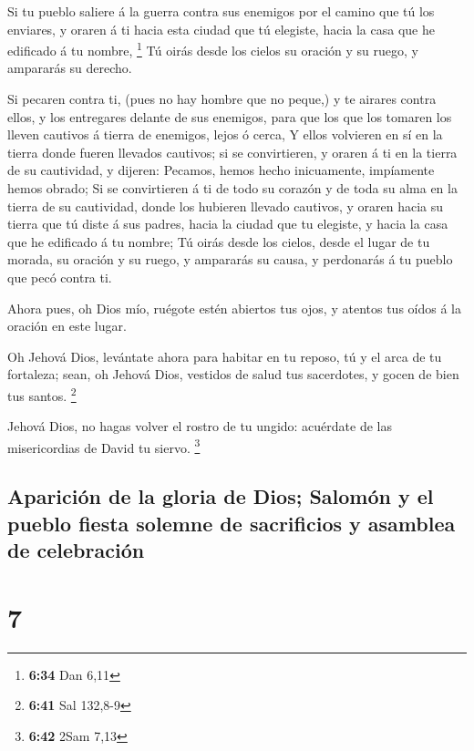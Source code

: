  Si tu pueblo saliere á la guerra contra sus enemigos por
el camino que tú los enviares, y oraren á ti hacia esta ciudad que tú
elegiste, hacia la casa que he edificado á tu nombre, \footnote{\textbf{6:34}
  Dan 6,11}  Tú oirás desde los cielos su oración y su
ruego, y ampararás su derecho.

 Si pecaren contra ti, (pues no hay hombre que no peque,) y
te airares contra ellos, y los entregares delante de sus enemigos, para
que los que los tomaren los lleven cautivos á tierra de enemigos, lejos
ó cerca,  Y ellos volvieren en sí en la tierra donde fueren
llevados cautivos; si se convirtieren, y oraren á ti en la tierra de su
cautividad, y dijeren: Pecamos, hemos hecho inicuamente, impíamente
hemos obrado;  Si se convirtieren á ti de todo su corazón y
de toda su alma en la tierra de su cautividad, donde los hubieren
llevado cautivos, y oraren hacia su tierra que tú diste á sus padres,
hacia la ciudad que tu elegiste, y hacia la casa que he edificado á tu
nombre;  Tú oirás desde los cielos, desde el lugar de tu
morada, su oración y su ruego, y ampararás su causa, y perdonarás á tu
pueblo que pecó contra ti.

 Ahora pues, oh Dios mío, ruégote estén abiertos tus ojos,
y atentos tus oídos á la oración en este lugar.

 Oh Jehová Dios, levántate ahora para habitar en tu reposo,
tú y el arca de tu fortaleza; sean, oh Jehová Dios, vestidos de salud
tus sacerdotes, y gocen de bien tus santos. \footnote{\textbf{6:41} Sal
  132,8-9}

 Jehová Dios, no hagas volver el rostro de tu ungido:
acuérdate de las misericordias de David tu siervo. \footnote{\textbf{6:42}
  2Sam 7,13}

\hypertarget{apariciuxf3n-de-la-gloria-de-dios-salomuxf3n-y-el-pueblo-fiesta-solemne-de-sacrificios-y-asamblea-de-celebraciuxf3n}{%
\subsection{Aparición de la gloria de Dios; Salomón y el pueblo fiesta
solemne de sacrificios y asamblea de
celebración}\label{apariciuxf3n-de-la-gloria-de-dios-salomuxf3n-y-el-pueblo-fiesta-solemne-de-sacrificios-y-asamblea-de-celebraciuxf3n}}

\hypertarget{section-6}{%
\section{7}\label{section-6}}

